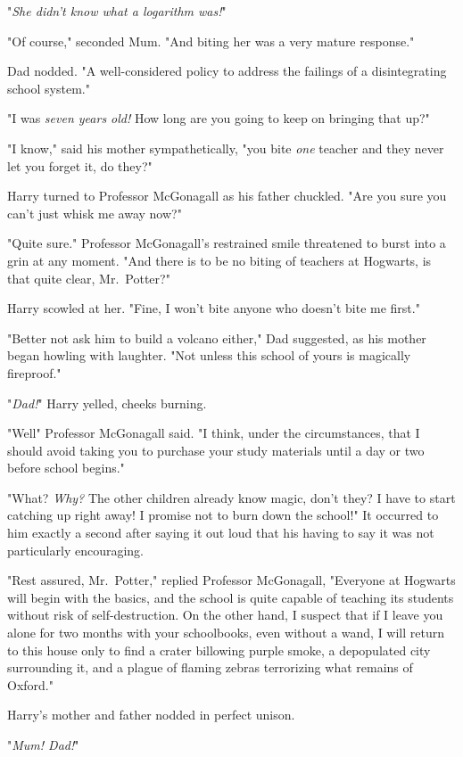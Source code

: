 "\emph{She didn't know what a logarithm was!}"

"Of course," seconded Mum. "And biting her was a very mature response."

Dad nodded. "A well-considered policy to address the
failings of a disintegrating school system."

"I was \emph{seven years old!} How long are you going to keep on bringing that
up?"

"I know," said his mother sympathetically, "you bite \emph{one} teacher
and they never let you forget it, do they?"

Harry turned to Professor McGonagall as his father
chuckled. "Are you sure you can't just whisk me away now?"

"Quite sure." Professor McGonagall's restrained smile
threatened to burst into a grin at any moment. "And there
is to be no biting of teachers at Hogwarts, is that quite
clear, Mr.~Potter?"

Harry scowled at her. "Fine, I won't bite anyone who
doesn't bite me first."

"Better not ask him to build a volcano either," Dad
suggested, as his mother began howling with laughter.
"Not unless this school of yours is magically fireproof."

"\emph{Dad!}" Harry yelled, cheeks burning.

"Well{\el}" Professor McGonagall said. "I think, under the
circumstances, that I should avoid taking you to purchase
your study materials until a day or two before school begins."

"What? \emph{Why?} The other children already know magic, don't
they? I have to start catching up right away! I promise
not to burn down the school!" It occurred to him exactly a
second after saying it out loud that his having to say it
was not particularly encouraging.

"Rest assured, Mr.~Potter," replied Professor McGonagall,
"Everyone at Hogwarts will begin with the basics, and the
school is quite capable of teaching its students without risk
of self-destruction. On the other hand, I suspect that if I
leave you alone for two months with your schoolbooks,
even without a wand, I will return to this house only to
find a crater billowing purple smoke, a depopulated city
surrounding it, and a plague of flaming zebras terrorizing
what remains of Oxford."

Harry's mother and father nodded in perfect unison.

"\emph{Mum! Dad!}"
